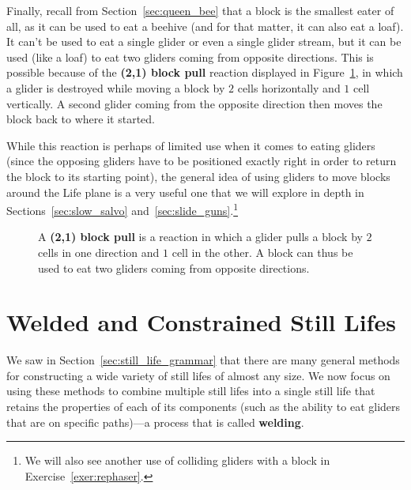 Finally, recall from Section~\ref{sec:queen_bee} that a block is the smallest eater of all, as it can be used to eat a beehive (and for that matter, it can also eat a loaf). It can't be used to eat a single glider or even a single glider stream, but it can be used (like a loaf) to eat two gliders coming from opposite directions. This is possible because of the \textbf{(2,1) block pull} reaction displayed in Figure~\ref{fig:glider_block_move}, in which a glider is destroyed while moving a block by $2$ cells horizontally and $1$ cell vertically. A second glider coming from the opposite direction then moves the block back to where it started.

While this reaction is perhaps of limited use when it comes to eating gliders (since the opposing gliders have to be positioned exactly right in order to return the block to its starting point), the general idea of using gliders to move blocks around the Life plane is a very useful one that we will explore in depth in Sections~\ref{sec:slow_salvo} and~\ref{sec:slide_guns}.\footnote{We will also see another use of colliding gliders with a block in Exercise~\ref{exer:rephaser}.}

\begin{figure}[!htb]
	\centering
	\caption{A \textbf{(2,1) block pull} is a reaction in which a glider pulls a block by $2$ cells in one direction and $1$ cell in the other. A block can thus be used to eat two gliders coming from opposite directions.}\label{fig:glider_block_move}
\end{figure}


\section{Welded and Constrained Still Lifes}\label{sec:welding}

We saw in Section~\ref{sec:still_life_grammar} that there are many general methods for constructing a wide variety of still lifes of almost any size. We now focus on using these methods to combine multiple still lifes into a single still life that retains the properties of each of its components (such as the ability to eat gliders that are on specific paths)---a process that is called \textbf{welding}.

